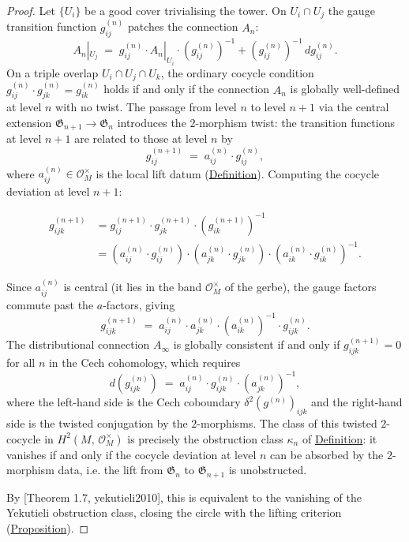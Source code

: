 \begin{proof}
Let $\{U_i\}$ be a good cover trivialising the tower.  On
$U_i \cap U_j$ the gauge transition function $g_{ij}^{(n)}$ patches
the connection $A_n$:
\[
A_n|_{U_j} \;=\; g_{ij}^{(n)} \cdot A_n|_{U_i} \cdot
  (g_{ij}^{(n)})^{-1} + (g_{ij}^{(n)})^{-1}\, dg_{ij}^{(n)}.
\]
On a triple overlap $U_i \cap U_j \cap U_k$, the ordinary cocycle
condition $g_{ij}^{(n)} \cdot g_{jk}^{(n)} = g_{ik}^{(n)}$ holds if and
only if the connection $A_n$ is globally well-defined at level $n$ with
no twist.  The passage from level $n$ to level $n{+}1$ via the central
extension $\mathfrak{G}_{n+1} \to \mathfrak{G}_n$ introduces the
$2$-morphism twist: the transition functions at level $n{+}1$ are related
to those at level $n$ by
\[
g_{ij}^{(n+1)} \;=\; a_{ij}^{(n)} \cdot g_{ij}^{(n)},
\]
where $a_{ij}^{(n)} \in \mathcal{O}_M^{\times}$ is the local lift datum
(\hyperref[def:yekutieli-triple]{Definition}).  Computing the cocycle deviation
at level $n{+}1$:

\begin{align*}
  g_{ijk}^{(n+1)}
  &= g_{ij}^{(n+1)} \cdot g_{jk}^{(n+1)} \cdot (g_{ik}^{(n+1)})^{-1} \\
  &= (a_{ij}^{(n)} \cdot g_{ij}^{(n)}) \cdot (a_{jk}^{(n)} \cdot g_{jk}^{(n)})
     \cdot (a_{ik}^{(n)} \cdot g_{ik}^{(n)})^{-1}.
\end{align*}

Since $a_{ij}^{(n)}$ is central (it lies in the band
$\mathcal{O}_M^{\times}$ of the gerbe), the gauge factors commute past
the $a$-factors, giving
\[
g_{ijk}^{(n+1)}
  \;=\;
  a_{ij}^{(n)} \cdot a_{jk}^{(n)} \cdot (a_{ik}^{(n)})^{-1}
  \cdot g_{ijk}^{(n)}.
\]
The distributional connection $A_\infty$ is globally consistent if and
only if $g_{ijk}^{(n+1)} = 0$ for all $n$ in the Cech cohomology,
which requires
\[
d(g_{ijk}^{(n)})
  \;=\;
  a_{ij}^{(n)} \cdot g_{ijk}^{(n)} \cdot (a_{jk}^{(n)})^{-1},
\]
where the left-hand side is the Cech coboundary
$\delta^2(g^{(n)})_{ijk}$ and the right-hand side is the twisted
conjugation by the $2$-morphisms.  The class of this twisted $2$-cocycle
in $H^2(M,\, \mathcal{O}_M^{\times})$ is precisely the obstruction
class $\kappa_n$ of
\hyperref[def:quantum-characteristic-classes]{Definition}: it vanishes if and
only if the cocycle deviation at level $n$ can be absorbed by the
$2$-morphism data, i.e. the lift from $\mathfrak{G}_n$ to
$\mathfrak{G}_{n+1}$ is unobstructed.

By [Theorem 1.7, yekutieli2010], this is equivalent to the
vanishing of the Yekutieli obstruction class, closing the circle with
the lifting criterion (\hyperref[prop:yekutieli-lifting]{Proposition}).
\end{proof}

